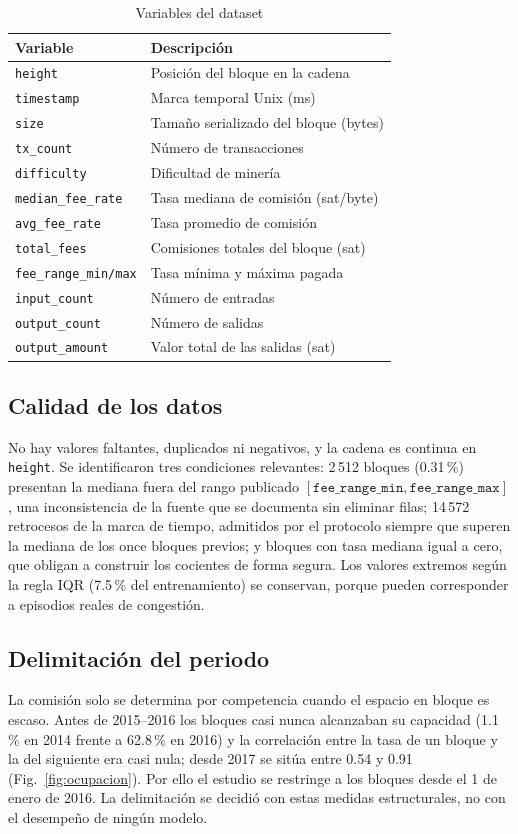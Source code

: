 \documentclass[conference]{IEEEtran}
\begin{document}
\begin{table}[htbp]
\caption{Variables del dataset}
\label{tab:variables}
\centering
\small
\begin{tabular}{ll}
\toprule
Variable & Descripción \\
\midrule
\texttt{height} & Posición del bloque en la cadena \\
\texttt{timestamp} & Marca temporal Unix (ms) \\
\texttt{size} & Tamaño serializado del bloque (bytes) \\
\texttt{tx\_count} & Número de transacciones \\
\texttt{difficulty} & Dificultad de minería \\
\texttt{median\_fee\_rate} & Tasa mediana de comisión (sat/byte) \\
\texttt{avg\_fee\_rate} & Tasa promedio de comisión \\
\texttt{total\_fees} & Comisiones totales del bloque (sat) \\
\texttt{fee\_range\_min/max} & Tasa mínima y máxima pagada \\
\texttt{input\_count} & Número de entradas \\
\texttt{output\_count} & Número de salidas \\
\texttt{output\_amount} & Valor total de las salidas (sat) \\
\bottomrule
\end{tabular}
\end{table}

\subsection{Calidad de los datos}
No hay valores faltantes, duplicados ni negativos, y la cadena es continua en \texttt{height}. Se identificaron tres condiciones relevantes: 2\,512 bloques (0.31\,\%) presentan la mediana fuera del rango publicado $[\texttt{fee\_range\_min}, \texttt{fee\_range\_max}]$, una inconsistencia de la fuente que se documenta sin eliminar filas; 14\,572 retrocesos de la marca de tiempo, admitidos por el protocolo siempre que superen la mediana de los once bloques previos; y bloques con tasa mediana igual a cero, que obligan a construir los cocientes de forma segura. Los valores extremos según la regla IQR (7.5\,\% del entrenamiento) se conservan, porque pueden corresponder a episodios reales de congestión.

\subsection{Delimitación del periodo}
La comisión solo se determina por competencia cuando el espacio en bloque es escaso. Antes de 2015--2016 los bloques casi nunca alcanzaban su capacidad (1.1\,\% en 2014 frente a 62.8\,\% en 2016) y la correlación entre la tasa de un bloque y la del siguiente era casi nula; desde 2017 se sitúa entre 0.54 y 0.91 (Fig.~\ref{fig:ocupacion}). Por ello el estudio se restringe a los bloques desde el 1 de enero de 2016. La delimitación se decidió con estas medidas estructurales, no con el desempeño de ningún modelo.
\end{document}
